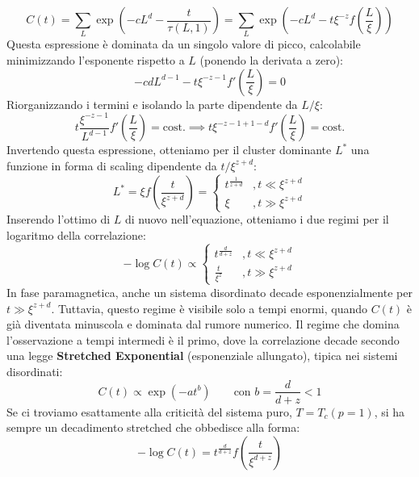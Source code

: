 \begin{equation}
    C(t) = \sum_L \exp\left( - c L^d - \frac{t}{\tau(L,1)} \right) = \sum_L \exp\left( - c L^d - t \xi^{-z} f\left( \frac{L}{\xi} \right) \right)
\end{equation}
Questa espressione è dominata da un singolo valore di picco, calcolabile minimizzando l'esponente rispetto a $L$ (ponendo la derivata a zero):
\begin{equation}
    - c d L^{d-1} - t \xi^{-z-1} f'\left(\frac{L}{\xi}\right) = 0
\end{equation}
Riorganizzando i termini e isolando la parte dipendente da $L/\xi$:
\begin{equation}
    t \frac{\xi^{-z-1}}{L^{d-1}} f'\left(\frac{L}{\xi}\right) = \text{cost.} \implies t \xi^{-z-1+1-d} f'\left(\frac{L}{\xi}\right) = \text{cost.}
\end{equation}
Invertendo questa espressione, otteniamo per il cluster dominante $L^*$ una funzione in forma di scaling dipendente da $t/\xi^{z+d}$:
\begin{equation}
    L^* = \xi f\left( \frac{t}{\xi^{z+d}} \right) = 
    \begin{cases}
        t^{\frac{1}{z+d}} & , t \ll \xi^{z+d} \\
        \xi & , t \gg \xi^{z+d}
    \end{cases}
\end{equation}
Inserendo l'ottimo di $L$ di nuovo nell'equazione, otteniamo i due regimi per il logaritmo della correlazione:
\begin{equation}
    - \log C(t) \propto
    \begin{cases}
        t^{\frac{d}{d+z}} & , t \ll \xi^{z+d} \\
        \frac{t}{\xi^z} & , t \gg \xi^{z+d}
    \end{cases}
\end{equation}
In fase paramagnetica, anche un sistema disordinato decade esponenzialmente per $t \gg \xi^{z+d}$. Tuttavia, questo regime è visibile solo a tempi enormi, quando $C(t)$ è già diventata minuscola e dominata dal rumore numerico.
Il regime che domina l'osservazione a tempi intermedi è il primo, dove la correlazione decade secondo una legge \textbf{Stretched Exponential} (esponenziale allungato), tipica nei sistemi disordinati:
\begin{equation}
    C(t) \propto \exp\left( - a t^b \right) \qquad \text{con } b = \frac{d}{d+z} < 1
\end{equation}
Se ci troviamo esattamente alla criticità del sistema puro, $T = T_c(p=1)$, si ha sempre un decadimento stretched che obbedisce alla forma:
\begin{equation}
    - \log C(t) = t^{\frac{d}{d+z}} f\left( \frac{t}{\xi^{d+z}} \right)
\end{equation}


